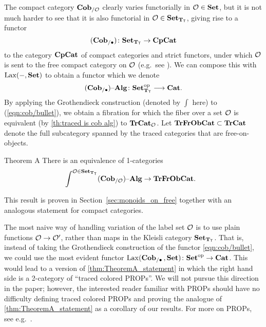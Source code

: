 \documentclass[11pt,oneside,article]{memoir}
\begin{document}
The compact category $\mathbf{Cob}_{/\mathcal{O}}$ clearly varies functorially in $\mathcal{O}\in\mathbf{Set}$, but it is not
much harder to see that it is also functorial in $\mathcal{O}\in\mathbf{Set}_{\mathbf{T}_{\mathsf{T}}}$, giving rise to a functor
\[
  (\mathbf{Cob}_{/\bullet})\colon\mathbf{Set}_{\mathbf{T}_{\mathsf{T}}}\to\mathbf{CpCat}
\]
to the category $\mathbf{CpCat}$ of compact categories and strict functors, under which $\mathcal{O}$ is sent
to the free compact category on $\mathcal{O}$ (e.g.\ see \cite{KellyLaplaza,Abramsky2}). We can compose
this with $\operatorname{Lax}(-,\mathbf{Set})$ to obtain a functor which we denote
\begin{equation}
      \label{eqn:cob/bullet}
   (\mathbf{Cob}_{/\bullet}){\text \textendash}\mathbf{Alg}\colon\mathbf{Set}_{\mathbf{T}_{\mathsf{T}}}^{\mathrm{op}}\longrightarrow\mathbf{Cat}.
\end{equation}
By applying the Grothendieck construction (denoted by $\int$ here) to (\ref{eqn:cob/bullet}), we
obtain a fibration for which the fiber over a set $\mathcal{O}$ is equivalent (by \ref{th:traced is cob
alg}) to $\mathbf{TrCat}_{\mathcal{O}}$. Let $\mathbf{TrFrObCat}\subset\mathbf{TrCat}$ denote the full subcategory spanned by
the traced categories that are free-on-objects.

\begin{named}{Theorem A}
    \label{thm:TheoremA_statement}
  There is an equivalence of 1-categories
  \begin{align*}
    &\int^{\mathcal{O}\in\mathbf{Set}_{\mathbf{T}_{\mathsf{T}}}}(\mathbf{Cob}_{/\mathcal{O}}){\text \textendash}\mathbf{Alg} \to \mathbf{TrFrObCat}.
  \end{align*}
\end{named}

This result is proven in Section~\ref{sec:monoids_on_free} together with an analogous statement for
compact categories.

\begin{remark}
  The most naive way of handling variation of the label set $\mathcal{O}$ is to use plain functions
  $\mathcal{O}\to\mathcal{O}'$, rather than maps in the Kleisli category $\mathbf{Set}_{\mathbf{T}_{\mathsf{T}}}$. That is, instead of
  taking the Grothendieck construction of the functor \eqref{eqn:cob/bullet}, we could use the most
  evident functor $\operatorname{Lax}(\mathbf{Cob}_{/\bullet}\,,\mathbf{Set})\colon{\mathbf{Set}}^{\text{op}}\to\mathbf{Cat}$. This would lead to a version
  of \ref{thm:TheoremA_statement} in which the right hand side is a 2-category of ``traced colored
  PROPs''. We will not pursue this direction in the paper; however, the interested reader familiar
  with PROPs should have no difficulty defining traced colored PROPs and proving the analogue of
  \ref{thm:TheoremA_statement} as a corollary of our results. For more on PROPs, see
  e.g.~\cite{HackneyRobertson}.
\end{remark}
\end{document}
